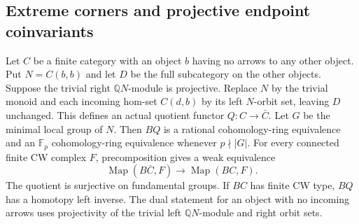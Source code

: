 \subsection{Extreme corners and projective endpoint coinvariants}

\begin{proposition}
\label{C:finite-target-extreme-corner}
Let $C$ be a finite category with an object $b$ having no arrows
to any other object. Put $N=C(b,b)$ and let $D$ be the full
subcategory on the other objects. Suppose the trivial right
$\mathbb QN$-module is projective. Replace $N$ by the trivial
monoid and each incoming hom-set $C(d,b)$ by its left $N$-orbit
set, leaving $D$ unchanged. This defines an actual quotient
functor $Q:C\to\bar C$.
Let $G$ be the minimal local group of $N$. Then $BQ$ is a
rational cohomology-ring equivalence and an $\mathbb F_p$
cohomology-ring equivalence whenever $p\nmid|G|$. For every
connected finite CW complex $F$, precomposition gives a weak
equivalence
\[
 \operatorname{Map}(B\bar C,F)\longrightarrow
 \operatorname{Map}(BC,F).
\]
The quotient is surjective on fundamental groups. If $BC$ has
finite CW type, $BQ$ has a homotopy left inverse.
The dual statement for an object with no incoming arrows uses
projectivity of the trivial left $\mathbb QN$-module and right
orbit sets.
\end{proposition}
